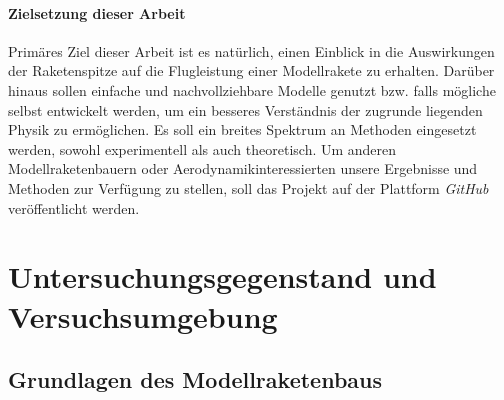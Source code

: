 \documentclass[10pt,a4paper]{article}
\begin{document}
\paragraph{Zielsetzung dieser Arbeit}
Primäres Ziel dieser Arbeit ist es natürlich, einen Einblick in die Auswirkungen der Raketenspitze auf die Flugleistung einer Modellrakete zu erhalten. Darüber hinaus sollen einfache und nachvollziehbare Modelle genutzt bzw. falls mögliche selbst entwickelt werden, um ein besseres Verständnis der zugrunde liegenden Physik zu ermöglichen. Es soll ein breites Spektrum an Methoden eingesetzt werden, sowohl experimentell als auch theoretisch. Um anderen Modellraketenbauern oder Aerodynamikinteressierten unsere Ergebnisse und Methoden zur Verfügung zu stellen, soll das Projekt auf der Plattform  \emph{GitHub} veröffentlicht werden.



\section{Untersuchungsgegenstand und Versuchsumgebung}

\subsection{Grundlagen des Modellraketenbaus}
%
%	
%	
%	
%	
\end{document}
